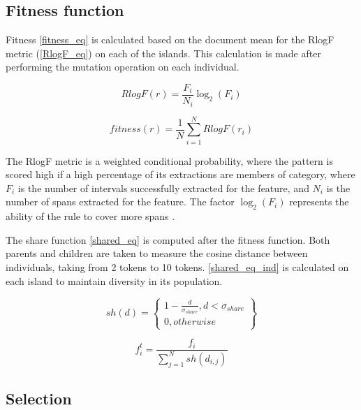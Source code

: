 \documentclass{IEEEtran}
\begin{document}
\subsection{Fitness function}

Fitness \ref{fitness_eq} is calculated based on the document mean for the RlogF metric (\ref*{RlogF_eq})\cite{seman_lex} on each of the islands. This calculation is made after performing the mutation operation on each individual.

\begin{equation}
  \label{RlogF_eq}
  RlogF(r) = \frac{F_i}{N_i} {\log_2}({F_i})
\end{equation}

\begin{equation}
  \label{fitness_eq}
  fitness(r) = \frac{1}{N} \sum_{i=1}^{N} RlogF(r_i)
\end{equation}

The RlogF metric is a weighted conditional probability, where the pattern is scored high if a high percentage of its extractions are members of category\cite{seman_lex}, where ${F_i}$ is the number of intervals successfully extracted for the feature,
and ${ N_i}$ is the number of spans extracted for the feature. The factor ${\log_2}({F_i})$ represents the ability of the rule to cover more spans \cite{tallor}.

The share function \ref{shared_eq} is computed after the fitness function. Both parents and children are taken to measure the cosine distance between individuals, taking from 2 tokens to 10 tokens. \ref{shared_eq_ind} is calculated on each island to maintain diversity in its population.

\begin{equation}
  \label{shared_eq}
  sh(d) = \left \{
  \begin{array}{l}
    1  - \frac{d}{\sigma_{share}}, d < {\sigma_{share}} \\
    0, otherwise
  \end{array}
  \right \}
\end{equation}

\begin{equation}
  \label{shared_eq_ind}
  f^t_i = \frac{f_i}{\sum_{j=1}^N sh(d_{i,j})}
\end{equation}

\subsection{Selection}
\end{document}
